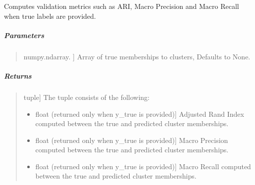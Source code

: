 \documentclass[letterpaper,10pt,english,openany,oneside]{sphinxmanual}
\begin{document}

\begin{fulllineitems}
\label{\detokenize{api_reference/generated/QuadratiK.spherical_clustering.PKBC:QuadratiK.spherical_clustering.PKBC.validation}}
\pysigstartsignatures
{}
\pysigstopsignatures
\sphinxAtStartPar
Computes validation metrics such as ARI, Macro Precision 
and Macro Recall when true labels are provided.


\subparagraph{Parameters}
\label{\detokenize{api_reference/generated/QuadratiK.spherical_clustering.PKBC:id3}}\begin{quote}
\begin{description}
\sphinxlineitem{y\_true}{[}numpy.ndarray. {]}
\sphinxAtStartPar
Array of true memberships to clusters,
Defaults to None.

\end{description}
\end{quote}


\subparagraph{Returns}
\label{\detokenize{api_reference/generated/QuadratiK.spherical_clustering.PKBC:id4}}\begin{quote}
\begin{description}
\sphinxlineitem{validation metrics}{[}tuple{]}
\sphinxAtStartPar
The tuple consists of the following:
\begin{itemize}
\item {} \begin{description}
\sphinxlineitem{Adjusted Rand Index}{[}float (returned only when y\_true is provided){]}
\sphinxAtStartPar
Adjusted Rand Index computed between the true and predicted cluster memberships.

\end{description}

\item {} \begin{description}
\sphinxlineitem{Macro Precision}{[}float (returned only when y\_true is provided){]}
\sphinxAtStartPar
Macro Precision computed between the true and predicted cluster memberships.

\end{description}

\item {} \begin{description}
\sphinxlineitem{Macro Recall}{[}float (returned only when y\_true is provided){]}
\sphinxAtStartPar
Macro Recall computed between the true and predicted cluster memberships.


\end{description}
\end{itemize}
\end{description}
\end{quote}
\end{fulllineitems}
\end{document}
